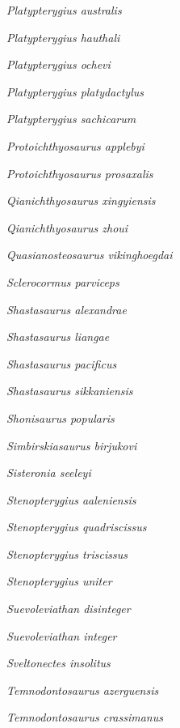 \emph{Platypterygius australis}~

\emph{Platypterygius hauthali}~

\emph{Platypterygius ochevi}~

\emph{Platypterygius platydactylus}~

\emph{Platypterygius sachicarum}~

\emph{Protoichthyosaurus applebyi}~

\emph{Protoichthyosaurus prosaxalis}~

\emph{Qianichthyosaurus xingyiensis}~

\emph{Qianichthyosaurus zhoui}~

\emph{Quasianosteosaurus vikinghoegdai}~

\emph{Sclerocormus parviceps}~

\emph{Shastasaurus alexandrae}~

\emph{Shastasaurus liangae}~

\emph{Shastasaurus pacificus}~

\emph{Shastasaurus sikkaniensis}~

\emph{Shonisaurus popularis}~

\emph{Simbirskiasaurus birjukovi}~

\emph{Sisteronia seeleyi}~

\emph{Stenopterygius aaleniensis}~

\emph{Stenopterygius quadriscissus}~

\emph{Stenopterygius triscissus}~

\emph{Stenopterygius uniter}~

\emph{Suevoleviathan disinteger}~

\emph{Suevoleviathan integer}~

\emph{Sveltonectes insolitus}~

\emph{Temnodontosaurus azerguensis}~

\emph{Temnodontosaurus crassimanus}~

